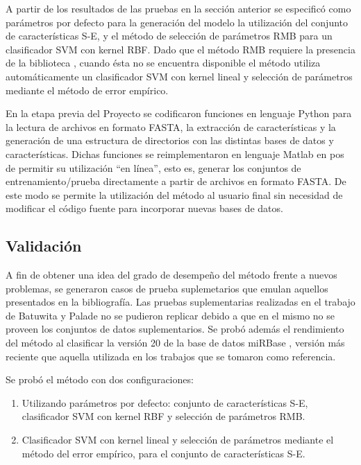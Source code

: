 \documentclass[12pt,bibliography=oldstyle,DIV=12,parskip=half-,titlepage]{scrartcl}
\begin{document}
A partir de los resultados de las pruebas en la sección anterior se
especificó como parámetros por defecto para la generación del modelo
la utilización del conjunto de características S-E, y el método de
selección de parámetros RMB para un clasificador SVM con kernel RBF.
Dado que el método RMB requiere la presencia de la biblioteca
, cuando ésta no se encuentra disponible el método utiliza
automáticamente un clasificador SVM con kernel lineal y selección de
parámetros mediante el método de error empírico.

En la etapa previa del Proyecto se codificaron funciones en lenguaje
Python para la lectura de archivos en formato FASTA, la extracción de
características y la generación de una estructura de directorios con
las distintas bases de datos y características.  Dichas funciones se
reimplementaron en lenguaje Matlab en pos de permitir su utilización
``en línea'', esto es, generar los conjuntos de entrenamiento/prueba
directamente a partir de archivos en formato FASTA. De este modo se
permite la utilización del método al usuario final sin necesidad de
modificar el código fuente para incorporar nuevas bases de datos.
%
%
\subsection{Validación}
%
A fin de obtener una idea del grado de desempeño del método frente a
nuevos problemas, se generaron casos de prueba suplemetarios que
emulan aquellos presentados en la bibliografía.
Las pruebas suplementarias realizadas en el trabajo de Batuwita y Palade
\cite{batuwita} no se pudieron replicar debido a que en el mismo
no se proveen los conjuntos de datos suplementarios.
Se probó además el
rendimiento del método al clasificar la versión 20 de la base de datos
miRBase \cite{mirbase3}, versión más reciente que aquella utilizada en
los trabajos que se tomaron como referencia.

Se probó el método con dos configuraciones:
\begin{enumerate}
\item Utilizando parámetros por defecto: conjunto de características S-E,
  clasificador SVM con kernel RBF y selección de parámetros RMB.
\item Clasificador SVM con kernel lineal y selección de parámetros
  mediante el método del error empírico, para el conjunto de
  características S-E.
\end{enumerate}
%
%
\end{document}
